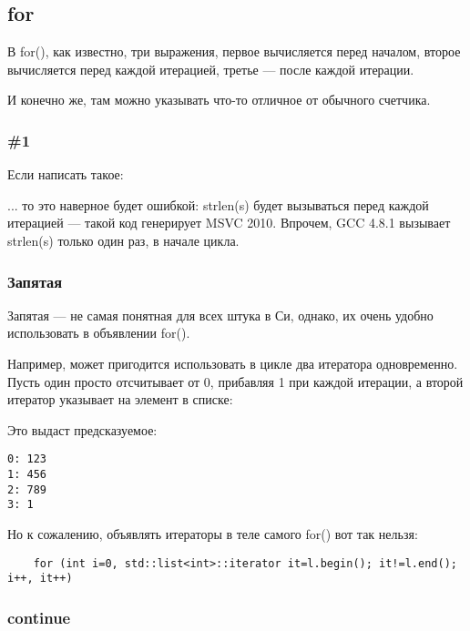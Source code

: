 ﻿\subsection{for}

В for(), как известно, три выражения, первое вычисляется перед началом, второе вычисляется перед каждой итерацией, третье --- после каждой итерации.

И конечно же, там можно указывать что-то отличное от обычного счетчика.

\subsubsection{ \#1}

Если написать такое:



... то это наверное будет ошибкой: strlen(s) будет вызываться перед каждой итерацией --- такой код генерирует
MSVC 2010. Впрочем, GCC 4.8.1 вызывает strlen(s) только один раз, в начале цикла.

\subsubsection{Запятая}

Запятая\cite[6.5.17]{C99TC3} --- не самая понятная для всех штука в Си, 
однако, их очень удобно использовать в объявлении for().

Например, может пригодится использовать в цикле два итератора одновременно. Пусть один просто отсчитывает
от 0, прибавляя 1 при каждой итерации, а второй итератор указывает на элемент в списке:



Это выдаст предсказуемое:

\begin{lstlisting}
0: 123
1: 456
2: 789
3: 1
\end{lstlisting}

Но к сожалению, объявлять итераторы в теле самого for() вот так нельзя:

\begin{lstlisting}
	for (int i=0, std::list<int>::iterator it=l.begin(); it!=l.end(); i++, it++)
\end{lstlisting}

\subsubsection{continue}

